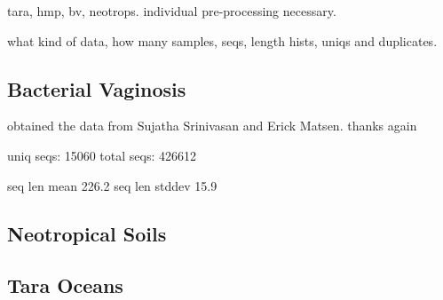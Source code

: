 

%
%
%



tara, hmp, bv, neotrops. individual pre-processing necessary.

what kind of data, how many samples, seqs, length hists, uniqs and duplicates.


\subsection{Bacterial Vaginosis}
\label{sec:MetagenomicDatasets:sub:BacterialVaginosis}

obtained the data from Sujatha Srinivasan and Erick Matsen. thanks again

uniq seqs: 15060
total seqs: 426612

seq len mean 226.2
seq len stddev 15.9


\subsection{Neotropical Soils}
\label{sec:MetagenomicDatasets:sub:NeotropicalSoils}


\subsection{Tara Oceans}
\label{sec:MetagenomicDatasets:sub:TaraOceans}

